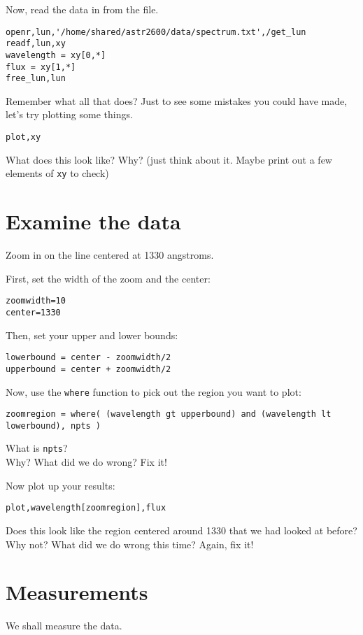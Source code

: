 \documentclass{article}
\begin{document}
\begin{spacing}{1.0}
Now, read the data in from the file.  
\begin{lstlisting}
openr,lun,'/home/shared/astr2600/data/spectrum.txt',/get_lun
readf,lun,xy
wavelength = xy[0,*]
flux = xy[1,*]
free_lun,lun
\end{lstlisting}

Remember what all that does?  Just to see some mistakes you could have made, let's try plotting some things.

\verb|plot,xy|

What does this look like?  Why?  (just think about it.  Maybe print out a few elements of \verb|xy| to check)

\section{Examine the data}
Zoom in on the line centered at 1330 angstroms.

First, set the width of the zoom and the center:
\begin{lstlisting}
zoomwidth=10
center=1330
\end{lstlisting}

Then, set your upper and lower bounds: \nobreak
\begin{verbatim}
lowerbound = center - zoomwidth/2
upperbound = center + zoomwidth/2
\end{verbatim}

Now, use the \verb|where| function to pick out the region you want to plot:
\begin{verbatim}
zoomregion = where( (wavelength gt upperbound) and (wavelength lt lowerbound), npts )
\end{verbatim}

What is \verb|npts|?  \underline{\hspace{3cm}}\\
Why?  What did we do wrong?  Fix it!

Now plot up your results:
\begin{verbatim}
plot,wavelength[zoomregion],flux
\end{verbatim}

Does this look like the region centered around 1330 that we had looked at before?  \\
Why not? What did we do wrong this time?  Again, fix it!

\section{Measurements}
We shall measure the data.


\end{spacing}
\end{document}
